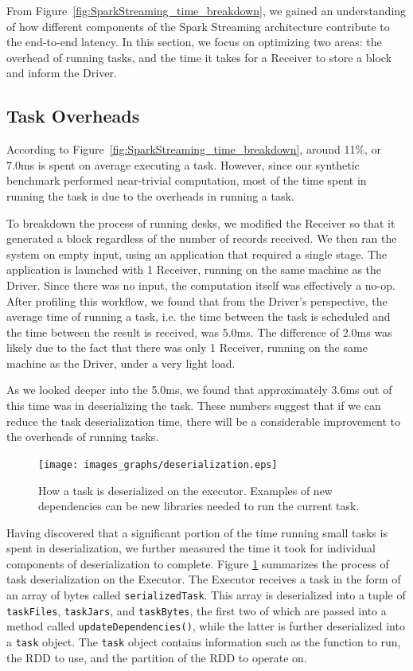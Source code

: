 From Figure~\ref{fig:SparkStreaming_time_breakdown}, we gained an understanding of how different components of the Spark Streaming architecture contribute to the end-to-end latency. In this section, we focus on optimizing two areas: the overhead of running tasks, and the time it takes for a Receiver to store a block and inform the Driver.

\subsection{Task Overheads}
According to Figure~\ref{fig:SparkStreaming_time_breakdown}, around 11\%, or 7.0ms is spent on average executing a task. However, since our synthetic benchmark performed near-trivial computation, most of the time spent in running the task is due to the overheads in running a task. 

To breakdown the process of running desks, we modified the Receiver so that it generated a block regardless of the number of records received. We then ran the system on empty input, using an application that required a single stage. The application is launched with 1 Receiver, running on the same machine as the Driver. Since there was no input, the computation itself was effectively a no-op. After profiling this workflow, we found that from the Driver's perspective, the average time of running a task, i.e. the time between the task is scheduled and the time between the result is received, was 5.0ms. The difference of 2.0ms was likely due to the fact that there was only 1 Receiver, running on the same machine as the Driver, under a very light load.

As we looked deeper into the 5.0ms, we found that approximately 3.6ms out of this time was in deserializing the task. These numbers suggest that if we can reduce the task deserialization time, there will be a considerable improvement to the overheads of running tasks.

\begin{figure}[t!]
 \begin{center}
   \texttt{[image: images\_graphs/deserialization.eps]}
 \end{center}
 \caption{How a task is deserialized on the executor. Examples of new dependencies can be new libraries needed to run the current task.}
 \label{fig:deserialization}
\end{figure}

Having discovered that a significant portion of the time running small tasks is spent in deserialization, we further measured the time it took for individual components of deserialization to complete. Figure \ref{fig:deserialization} summarizes the process of task deserialization on the Executor. The Executor receives a task in the form of an array of bytes called \texttt{serializedTask}. This array is deserialized into a tuple of \texttt{taskFiles}, \texttt{taskJars}, and \texttt{taskBytes}, the first two of which are passed into a method called \texttt{updateDependencies()}, while the latter is further deserialized into a \texttt{task} object. The \texttt{task} object contains information such as the function to run, the RDD to use, and the partition of the RDD to operate on.

